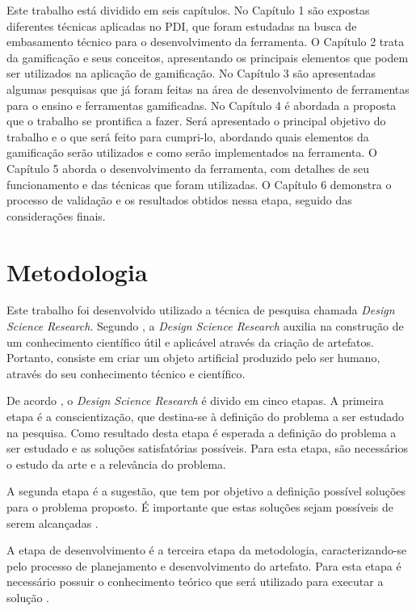 \documentclass[
	12pt,				%
	oneside,			%
	a4paper,			%
	english,			%
	french,				%
	spanish,			%
	brazil,				%
	]{abntex2}
\begin{document}
Este trabalho está dividido em seis capítulos. No Capítulo 1 são expostas diferentes técnicas aplicadas no PDI, que foram estudadas na busca de embasamento técnico para o desenvolvimento da ferramenta. O Capítulo 2 trata da gamificação e seus conceitos, apresentando os principais elementos que podem ser utilizados na aplicação de gamificação. No Capítulo 3 são apresentadas algumas pesquisas que já foram feitas na área de desenvolvimento de ferramentas para o ensino e ferramentas gamificadas. No Capítulo 4 é abordada a proposta que o trabalho se prontifica a fazer. Será apresentado o principal objetivo do trabalho e o que será feito para cumpri-lo, abordando quais elementos da gamificação serão utilizados e como serão implementados na ferramenta. O Capítulo 5 aborda o desenvolvimento da ferramenta, com detalhes de seu funcionamento e das técnicas que foram utilizadas. O Capítulo 6 demonstra o processo de validação e os resultados obtidos nessa etapa, seguido das considerações finais.

\chapter{Metodologia}

Este trabalho foi desenvolvido utilizado a técnica de pesquisa chamada \textit{Design Science Research}. Segundo \citet{dresch:2015}, a \textit{Design
Science Research} auxilia na construção de um conhecimento científico útil e aplicável através da criação de artefatos. Portanto, consiste em criar um objeto artificial produzido pelo ser humano, através do seu conhecimento técnico e científico.

De acordo \citet{dresch:2015}, o \textit{Design
Science Research} é divido em cinco etapas. A primeira etapa é a conscientização, que destina-se à definição do problema a ser estudado na pesquisa. Como resultado desta etapa é esperada a definição do problema a ser estudado e as soluções satisfatórias possíveis. Para esta etapa, são necessários o estudo da arte e a relevância do problema.

A segunda etapa é a sugestão, que tem por objetivo a definição  possível soluções para o problema proposto. É importante que estas soluções sejam  possíveis de serem alcançadas \cite{dresch:2015}.

A etapa de desenvolvimento é a terceira etapa da metodologia, caracterizando-se pelo processo de planejamento e desenvolvimento do artefato. Para esta etapa é necessário possuir o conhecimento teórico que será utilizado para executar a solução \cite{dresch:2015}.
\end{document}
